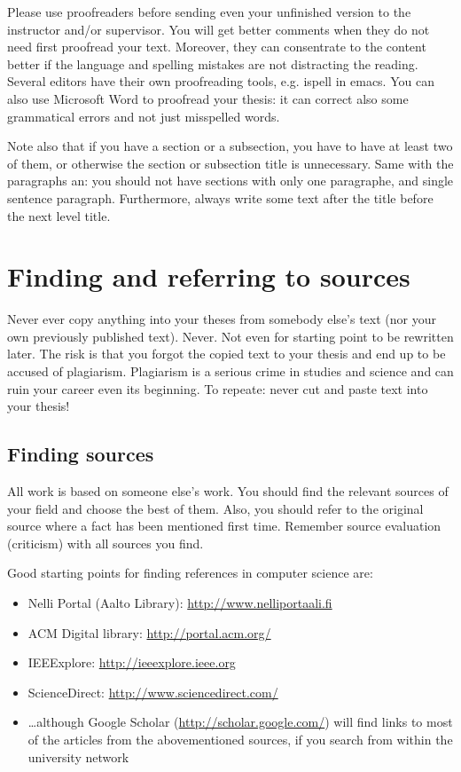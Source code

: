 \documentclass[12pt,a4paper,oneside,pdftex]{report}
\begin{document}
Please use proofreaders before sending even your unfinished version to
the instructor and/or supervisor. You will get better comments when
they do not need first proofread your text. Moreover, they can
consentrate to the content better if the language and spelling
mistakes are not distracting the reading. Several editors have their
own proofreading tools, e.g. ispell in emacs. You can also use
Microsoft Word to proofread your thesis: it can correct also some
grammatical errors and not just misspelled words.

Note also that if you have a section or a subsection, you have to have
at least two of them, or otherwise the section or subsection title is
unnecessary. Same with the paragraphs an: you should not have sections
with only one paragraphe, and single sentence paragraph. Furthermore,
always write some text after the title before the next level title.

\section{Finding and referring to sources}

Never ever copy anything into your theses from somebody else's text
(nor your own previously published text). Never. Not even for starting
point to be rewritten later. The risk is that you forgot the copied
text to your thesis and end up to be accused of plagiarism. Plagiarism
is a serious crime in studies and science and can ruin your career
even its beginning. To repeate: never cut and paste text into your
thesis!

\subsection{Finding sources}

All work is based on someone else's work. You should find the relevant
sources of your field and choose the best of them. Also, you should
refer to the original source where a fact has been mentioned first
time. Remember source evaluation (criticism) with all sources you
find.

Good starting points for finding references in computer science are:
\begin{itemize}
\setlength{\itemsep}{0pt}
\item Nelli Portal (Aalto Library): \url{http://www.nelliportaali.fi}
\item ACM Digital library: \url{http://portal.acm.org/}
\item IEEExplore: \url{http://ieeexplore.ieee.org}
\item ScienceDirect: \url{http://www.sciencedirect.com/}
\item \ldots although Google Scholar (\url{http://scholar.google.com/}) will
find links to most of the articles from the abovementioned sources, if you
search from within the university network
\end{itemize}
\end{document}
